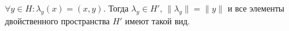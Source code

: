 \begin{to_thr}
	$\forall y \in H \colon \lambda_y(x) = (x,y)$. Тогда $\lambda_y \in H', \, \|\lambda_y\| = \|y\|$ и все элементы двойственного пространства $H'$ имеют такой вид.
\end{to_thr}